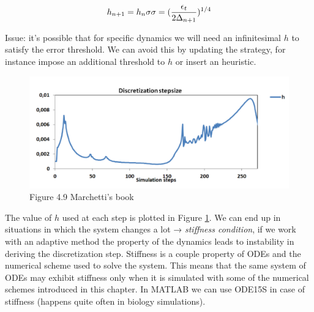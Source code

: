   $$h_{n+1}=h_n\sigma \\ \sigma =(\frac{\epsilon_t}{2\Delta_{n+1}})^{1/4}$$

\noindent
  Issue: it's possible that for specific dynamics we will need an infinitesimal $h$ to satisfy the error threshold.
  We can avoid this by updating the strategy, for instance impose an additional threshold to $h$ or insert an heuristic.


\begin{figure}
  \centering
   \includegraphics[width=\textwidth]{discretization.png}
  \caption{ Figure 4.9 Marchetti's book}
  \label{fig:discretization}
\end{figure}
 
  The value of $h$ used at each step is plotted in Figure \ref{fig:discretization}. We can end up in situations in which the system changes a lot → \emph{stiffness condition}, if we work with an adaptive method the property of the dynamics leads to instability in deriving the discretization step.
  Stiffness is a couple property of ODEs and the numerical scheme used to solve the system.
  This means that the same system of ODEs may exhibit stiffness only when it is simulated with some of the numerical schemes introduced in this chapter.
  In MATLAB we can use ODE15S in case of stiffness (happens quite often in biology simulations).
